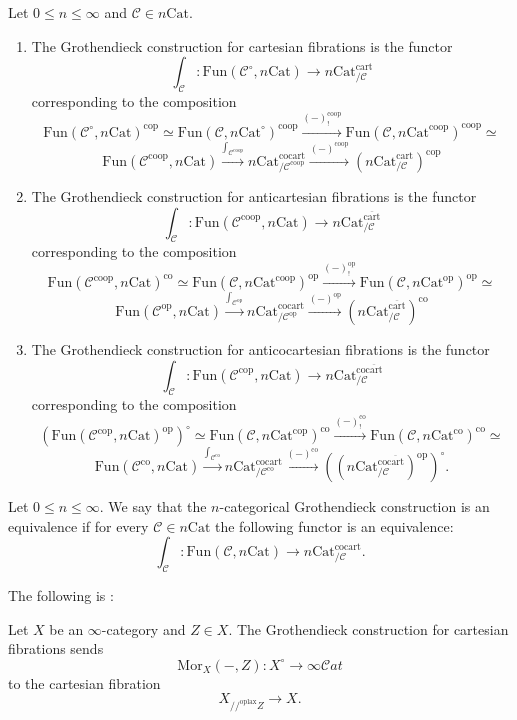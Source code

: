 \documentclass[10pt,oneside]{article}
\numberwithin{equation}{section} %
\numberwithin{figure}{section} %
\theoremstyle{plain}
\theoremstyle{definition}
\newcommand{\mC}{{\mathcal C}}
\newcommand{\X}{X}
\newcommand{\op}{\mathrm{op}}
\newcommand{\co}{\mathrm{co}}
\newcommand{\Cat}{\mathrm{Cat}}
\newcommand{\Fun}{\mathrm{Fun}}
\newcommand{\cocart}{{\mathrm{cocart}}}
\newcommand{\cart}{{\mathrm{cart}}}
\newcommand{\oplax}{{\mathrm{oplax}}}
\newcommand{\Mor}{{\mathrm{Mor}}}
\newcommand{\cop}{\mathrm{cop}}
\newcommand{\scat}{\mathcal{C}\mathit{at}}
\begin{document}
\begin{definition}
Let $ 0 \leq n \leq \infty$ and $\mC \in {n\Cat}$.
\begin{enumerate}[\normalfont(1)]\setlength{\itemsep}{-2pt}
\item The Grothendieck construction for cartesian fibrations is the 
functor $$\int_\mC: \Fun(\mC^\circ, n\Cat) \to {n\Cat}^\cart_{/\mC}$$
corresponding to the composition
$$\Fun(\mC^\circ, n\Cat)^\cop \simeq \Fun(\mC, n\Cat^\circ)^{\co\op} \xrightarrow{(-)^{\co\op}_!} \Fun(\mC, n\Cat^{\co\op})^{\co\op} \simeq $$$$ \Fun(\mC^{\co\op}, n\Cat) \xrightarrow{\int_{\mC^{\co\op}}} {n\Cat}^\cocart_{/\mC^{\co\op}} \xrightarrow{(-)^{\co\op}} ({n\Cat}^\cart_{/\mC})^\cop$$


\item The Grothendieck construction for anticartesian fibrations is the functor $$\int_\mC: \Fun(\mC^{\co\op}, n\Cat) \to {n\Cat}^{\overline{\cart}}_{/\mC}$$
corresponding to the composition $$ \Fun(\mC^{\co\op}, n\Cat)^\co \simeq \Fun(\mC, n\Cat^{\co\op})^\op \xrightarrow{(-)^{\op}_!} \Fun(\mC, n\Cat^\op)^\op \simeq $$$$ \Fun(\mC^\op, n\Cat) \xrightarrow{\int_{\mC^\op}} {n\Cat}^\cocart_{/\mC^\op} \xrightarrow{(-)^{\op}} ({n\Cat}^{\overline{\cart}}_{/\mC})^\co$$
\item The Grothendieck construction for anticocartesian fibrations is the
functor $$\int_\mC: \Fun(\mC^{\cop}, n\Cat) \to {n\Cat}^{\co\overline{\cart}}_{/\mC}$$
corresponding to the composition $$ (\Fun(\mC^\cop, n\Cat)^\op)^\circ \simeq \Fun(\mC, n\Cat^\cop)^\co \xrightarrow{(-)^{\co}_!} \Fun(\mC, n\Cat^\co)^\co \simeq $$$$ \Fun(\mC^\co, n\Cat) \xrightarrow{\int_{\mC^\co}} {n\Cat}^\cocart_{/\mC^\co} \xrightarrow{(-)^{\co}} (({n\Cat}^{\co\overline{\cart}}_{/\mC})^\op)^\circ.$$
\end{enumerate}
\end{definition}

\begin{definition}Let $ 0 \leq n \leq \infty.$
We say that the $n$-categorical Grothendieck construction is an equivalence if for every $\mC \in n\Cat$ the following functor is an equivalence:
$$\int_\mC: \Fun(\mC, n\Cat) \to {n\Cat}^\cocart_{/\mC}. $$
    
\end{definition}

The following is \cite[Corollary 4.6.9.]{gepner2026fibrations}:

\begin{corollary}\label{Grorep2}

Let $X$ be an $\infty$-category and $Z \in X.$
The Grothendieck construction for cartesian fibrations sends 
$$ \Mor_\X(-,Z): X^\circ \to \infty\scat $$ 
to the cartesian fibration $$ X_{//^\oplax Z} \to X. $$

\end{corollary}
\end{document}
